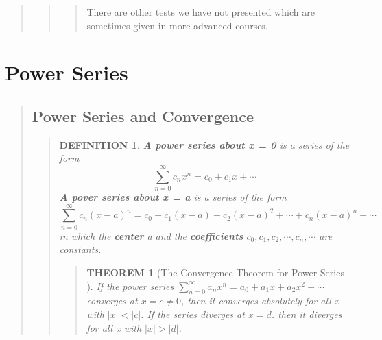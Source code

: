 \documentclass{report}
\newtheorem{theorem}{THEOREM}
\newtheorem*{definition}{DEFINITION}
\begin{document}
\begin{quote}
\begin{quote}
\begin{quote}
			\begin{info} %
				There are other tests we have not presented which are sometimes given in more advanced courses. 
			\end{info}
			
		\end{quote}


	\end{quote}

\end{quote}


\section{Power Series }
\begin{quote}

	\subsection{Power Series and Convergence}
	\begin{quote}

		\begin{definition}
			\textbf{A power series about x = 0} is a series of the form
			$$\sum_{n=0}^{\infty} c_n x^n  = c_0 + c_1x + \cdots$$
			\textbf{A pover series about x = a} is a series of the form
			$$\sum_{n=0}^{\infty}c_n (x-a)^n = c_0 + c_1 (x-a) + c_2 (x-a)^2 + \cdots + c_n (x-a)^n + \cdots$$
			in which the \textbf{center} a and the \textbf{coefficients} $c_0, c_1, c_2,\cdots , c_n,\cdots$ are constants.
		\end{definition}

		\begin{quote}
			\begin{theorem}[The Convergence Theorem for Power Series ]
				\mbox{}\par
				If the power series
				$\sum_{n=0}^{\infty} a_n x^n = a_0 + a_1x + a_2x^2 + \cdots $ converges at $x = c \neq 0$, then it converges absolutely for all x with $\left | x \right | < \left | c \right |$. If the series diverges at $x = d$. then it diverges for all x with $ \left | x \right | > \left | d \right |$.
			\end{theorem}
		\end{quote}

	\end{quote}
\end{quote}
\end{document}
